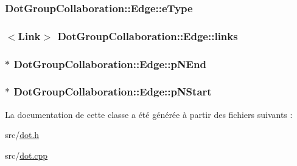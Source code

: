 \subsubsection[{e\+Type}]{ Dot\+Group\+Collaboration\+::\+Edge\+::e\+Type}\label{class_dot_group_collaboration_1_1_edge_a76a2ba25cd605e65eece591f41706626}
\hypertarget{class_dot_group_collaboration_1_1_edge_af8c82f23e5a2e9f3845fa402864eb6dd}{}
\subsubsection[{links}]{$<${\bf Link}$>$ Dot\+Group\+Collaboration\+::\+Edge\+::links}\label{class_dot_group_collaboration_1_1_edge_af8c82f23e5a2e9f3845fa402864eb6dd}
\hypertarget{class_dot_group_collaboration_1_1_edge_aaa1b8e53e4a95e63acde11b161331e11}{}
\subsubsection[{p\+N\+End}]{$\ast$ Dot\+Group\+Collaboration\+::\+Edge\+::p\+N\+End}\label{class_dot_group_collaboration_1_1_edge_aaa1b8e53e4a95e63acde11b161331e11}
\hypertarget{class_dot_group_collaboration_1_1_edge_a05c8193b7ab3fa66b1cfe1c7bd87e1d2}{}
\subsubsection[{p\+N\+Start}]{$\ast$ Dot\+Group\+Collaboration\+::\+Edge\+::p\+N\+Start}\label{class_dot_group_collaboration_1_1_edge_a05c8193b7ab3fa66b1cfe1c7bd87e1d2}


La documentation de cette classe a été générée à partir des fichiers suivants \+:\begin{DoxyCompactItemize}
\item 
src/\hyperlink{dot_8h}{dot.\+h}\item 
src/\hyperlink{dot_8cpp}{dot.\+cpp}\end{DoxyCompactItemize}
